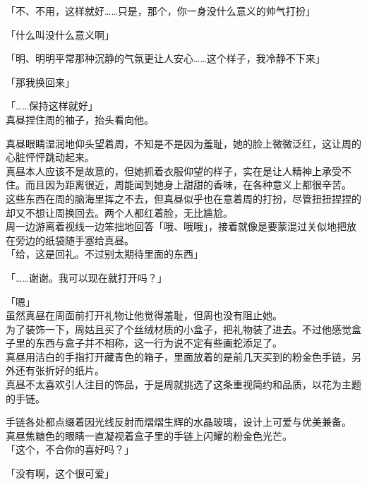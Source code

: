 「不、不用，这样就好……只是，那个，你一身没什么意义的帅气打扮」

「什么叫没什么意义啊」

「明、明明平常那种沉静的气氛更让人安心……这个样子，我冷静不下来」

「那我换回来」

「……保持这样就好」\\

真昼捏住周的袖子，抬头看向他。

真昼眼睛湿润地仰头望着周，不知是不是因为羞耻，她的脸上微微泛红，这让周的心脏怦怦跳动起来。\\

真昼本人应该不是故意的，但她抓着衣服仰望的样子，实在是让人精神上承受不住。而且因为距离很近，周能闻到她身上甜甜的香味，在各种意义上都很辛苦。\\

这些东西在周的脑海里挥之不去，但真昼似乎也在意着周的打扮，尽管扭扭捏捏的却又不想让周换回去。两个人都红着脸，无比尴尬。\\

周一边游离着视线一边笨拙地回答「哦、哦哦」，接着就像是要蒙混过关似地把放在旁边的纸袋随手塞给真昼。\\

「给，这是回礼。不过别太期待里面的东西」

「……谢谢。我可以现在就打开吗？」

「嗯」\\

虽然真昼在周面前打开礼物让他觉得羞耻，但周也没有阻止她。\\

为了装饰一下，周姑且买了个丝绒材质的小盒子，把礼物装了进去。不过他感觉盒子里的东西与盒子并不相称，这一行为说不定有些画蛇添足了。\\

真昼用洁白的手指打开藏青色的箱子，里面放着的是前几天买到的粉金色手链，另外还有张折好的纸片。\\

真昼不太喜欢引人注目的饰品，于是周就挑选了这条重视简约和品质，以花为主题的手链。

手链各处都点缀着因光线反射而熠熠生辉的水晶玻璃，设计上可爱与优美兼备。\\%

真昼焦糖色的眼睛一直凝视着盒子里的手链上闪耀的粉金色光芒。\\

「这个，不合你的喜好吗？」

「没有啊，这个很可爱」

